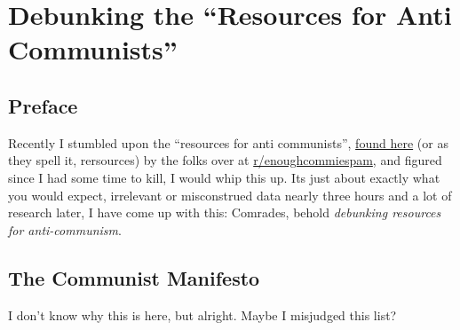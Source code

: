 \section{Debunking the ``Resources for Anti Communists''\\}
\subsection*{Preface}
Recently I stumbled upon the ``resources for anti communists'', \href{https://www.reddit.com/r/EnoughCommieSpam/wiki/anti_commie_resources}{found here} (or as they spell it, rersources) by the folks over at \href{https://np.reddit.com/r/enoughcommiespam}{r/enoughcommiespam}, and figured since I had some time to kill, I would whip this up.
Its just about exactly what you would expect, irrelevant or misconstrued data nearly three hours and a lot of research later, I have come up with this: Comrades, behold \emph{debunking resources for anti-communism}.

\subsection{The Communist Manifesto}
I don't know why this is here, but alright. Maybe I misjudged this list?

